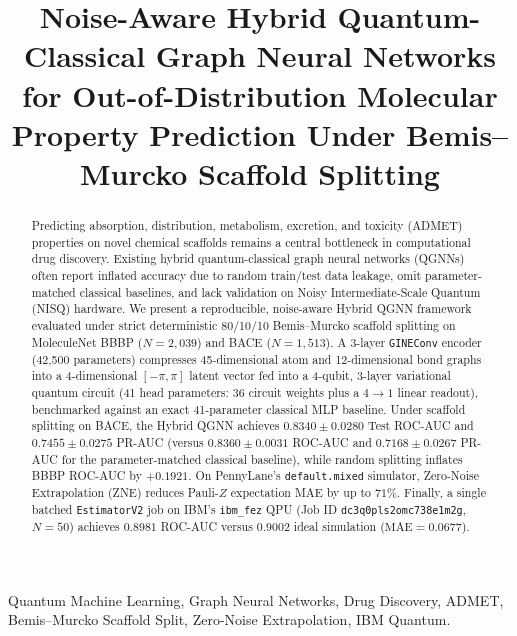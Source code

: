\documentclass[conference]{IEEEtran}
\begin{document}
\title{Noise-Aware Hybrid Quantum-Classical Graph Neural Networks for Out-of-Distribution Molecular Property Prediction Under Bemis--Murcko Scaffold Splitting}

\author{
}

\maketitle

\begin{abstract}
Predicting absorption, distribution, metabolism, excretion, and toxicity (ADMET) properties on novel chemical scaffolds remains a central bottleneck in computational drug discovery. Existing hybrid quantum-classical graph neural networks (QGNNs) often report inflated accuracy due to random train/test data leakage, omit parameter-matched classical baselines, and lack validation on Noisy Intermediate-Scale Quantum (NISQ) hardware. We present a reproducible, noise-aware Hybrid QGNN framework evaluated under strict deterministic 80/10/10 Bemis--Murcko scaffold splitting on MoleculeNet BBBP ($N=2{,}039$) and BACE ($N=1{,}513$). A 3-layer \texttt{GINEConv} encoder (42,500 parameters) compresses 45-dimensional atom and 12-dimensional bond graphs into a 4-dimensional $[-\pi,\pi]$ latent vector fed into a 4-qubit, 3-layer variational quantum circuit (41 head parameters: 36 circuit weights plus a $4\rightarrow 1$ linear readout), benchmarked against an exact 41-parameter classical MLP baseline. Under scaffold splitting on BACE, the Hybrid QGNN achieves $0.8340 \pm 0.0280$ Test ROC-AUC and $0.7455 \pm 0.0275$ PR-AUC (versus $0.8360 \pm 0.0031$ ROC-AUC and $0.7168 \pm 0.0267$ PR-AUC for the parameter-matched classical baseline), while random splitting inflates BBBP ROC-AUC by $+0.1921$. On PennyLane's \texttt{default.mixed} simulator, Zero-Noise Extrapolation (ZNE) reduces Pauli-$Z$ expectation MAE by up to $71\%$. Finally, a single batched \texttt{EstimatorV2} job on IBM's \texttt{ibm\_fez} QPU (Job ID \texttt{dc3q0pls2omc738e1m2g}, $N=50$) achieves $0.8981$ ROC-AUC versus $0.9002$ ideal simulation ($\text{MAE}=0.0677$).
\end{abstract}

\begin{IEEEkeywords}
Quantum Machine Learning, Graph Neural Networks, Drug Discovery, ADMET, Bemis--Murcko Scaffold Split, Zero-Noise Extrapolation, IBM Quantum.
\end{IEEEkeywords}
\end{document}
